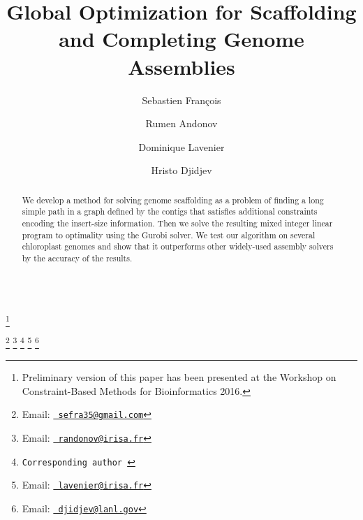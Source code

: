\documentclass{endmH}
\newcommand{\forLaterVersions}[1]{}
\begin{document}
\begin{verbatim}\end{verbatim}\vspace{2.5cm}

\begin{frontmatter}

\title{Global Optimization for Scaffolding and Completing Genome Assemblies }\thanks{Preliminary version of this paper has been presented at the Workshop on Constraint-Based Methods for Bioinformatics 2016.}

\author{Sebastien Fran\c{c}ois  }
\author{Rumen Andonov }
\author{Dominique Lavenier }
\address{IRISA/INRIA, Rennes, France}

\author{Hristo Djidjev }
\address{Los Alamos National Laboratory,
	Los Alamos, NM 87545, USA }
   \thanks[sebemail]{Email:
   \href{mailto:sefra35@gmail.com} {\texttt{\normalshape
   sefra35@gmail.com}}} 
   \thanks[rumemail]{Email:
   \href{randonov@irisa.fr} {\texttt{\normalshape
   randonov@irisa.fr}}}
   \thanks[Corrresponding]{{\texttt{\normalshape Corresponding author }}} 
   \thanks[domemail]{Email:
   \href{lavenier@irisa.fr} {\texttt{\normalshape
   lavenier@irisa.fr}}}
   \thanks[hriemail]{Email:
   \href{djidjev@lanl.gov} {\texttt{\normalshape
   djidjev@lanl.gov}}}
   

\begin{abstract}
We develop a method for solving genome scaffolding  as a problem of finding a long simple path in a graph defined by the contigs that satisfies additional constraints encoding the insert-size information. Then we solve the resulting mixed integer linear program to optimality using the Gurobi solver. We test our algorithm on several chloroplast genomes and show that it %
outperforms other widely-used assembly solvers by the accuracy of the results.
\end{abstract}

\forLaterVersions
{\begin{keyword}
genome assembly, scaffolding, contig, longest  simple weighted  path problem,
integer programming  
\end{keyword}}

\end{frontmatter}

\end{document}
